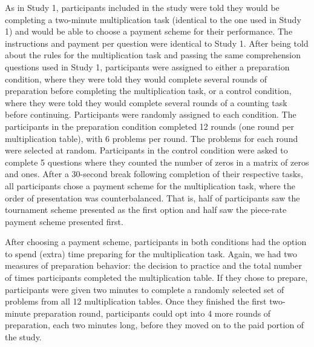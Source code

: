 \documentclass[a4paper, nobind]{templates/ociamthesis}
\begin{document}
As in Study 1, participants included in the study were told they would be completing a two-minute multiplication task (identical to the one used in Study 1) and would be able to choose a payment scheme for their performance. The instructions and payment per question were identical to Study 1. After being told about the rules for the multiplication task and passing the same comprehension questions used in Study 1, participants were assigned to either a preparation condition, where they were told they would complete several rounds of preparation before completing the multiplication task, or a control condition, where they were told they would complete several rounds of a counting task before continuing. Participants were randomly assigned to each condition. The participants in the preparation condition completed 12 rounds (one round per multiplication table), with 6 problems per round. The problems for each round were selected at random. Participants in the control condition were asked to complete 5 questions where they counted the number of zeros in a matrix of zeros and ones. After a 30-second break following completion of their respective tasks, all participants chose a payment scheme for the multiplication task, where the order of presentation was counterbalanced. That is, half of participants saw the tournament scheme presented as the first option and half saw the piece-rate payment scheme presented first.

After choosing a payment scheme, participants in both conditions had the option to spend (extra) time preparing for the multiplication task. Again, we had two measures of preparation behavior: the decision to practice and the total number of times participants completed the multiplication table. If they chose to prepare, participants were given two minutes to complete a randomly selected set of problems from all 12 multiplication tables. Once they finished the first two-minute preparation round, participants could opt into 4 more rounds of preparation, each two minutes long, before they moved on to the paid portion of the study.
\end{document}
